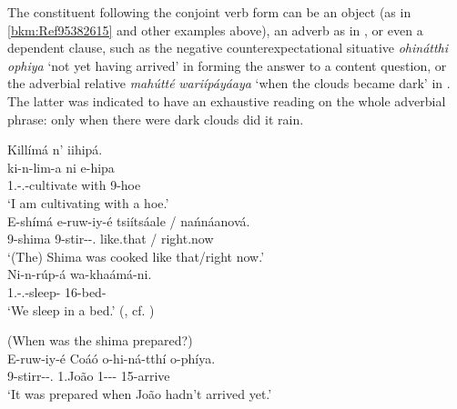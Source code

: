 \documentclass[output=paper]{langscibook}
\begin{document}
\z

The constituent following the conjoint verb form can be an object (as in \ref{bkm:Ref95382615} and other examples above), an adverb as in , or even a dependent clause, such as the negative counterexpectational situative \textit{ohinátthi} \textit{ophiya} ‘not yet having arrived’ in  forming the answer to a content question, or the adverbial relative \textit{mahútté} \textit{wariípáyáaya} ‘when the clouds became dark’ in . The latter was indicated to have an exhaustive reading on the whole adverbial phrase: only when there were dark clouds did it rain.

\ea
\label{bkm:Ref95810342}
\begin{xlist}
\exi{\CJ{}}
Killímá n’ iihipá.\\
\gll
ki-n-lim-a  ni  e-hipa\\
1\SG{}.\SM{}-\PRS{}.\CJ{}-cultivate  with  9-hoe\\
\glt
‘I am cultivating with a hoe.’\\

\exi{\CJ{}}
\gll
E-shímá  e-ruw-iy-é  tsiítsáale / nańnáanová.\\
9-shima  9\SM{}-stir-\PASS{}-\PFV{}.\CJ{}  like.that / right.now\\
\glt
‘(The) Shima was cooked like that/right now.’\\

\exi{\CJ{}}
\gll
Ni-n-rúp-á  wa-khaámá-ni.\\
1\PL{}.\SM{}-\PRS{}.\CJ{}-sleep-\FV{}  16-bed-\LOC{}\\
\glt
‘We sleep in a bed.’ (\citealt[49]{vanderWal2014}, cf. \citealt[221]{vanderWal2009a})\\
\end{xlist}

\z

\ea
\label{bkm:Ref95810699}
(When was the shima prepared?)\\
\gll
E-ruw-iy-é  Coáó  o-hi-ná-tthí  o-phíya.\\
9\SM{}-stirr-\PASS{}-\PFV{}.\CJ{}  1.João  1\SM{}-\NEG{}-\CE{}-\AUX{}  15-arrive\\
\glt
‘It was prepared when João hadn’t arrived yet.’\\
\end{document}
